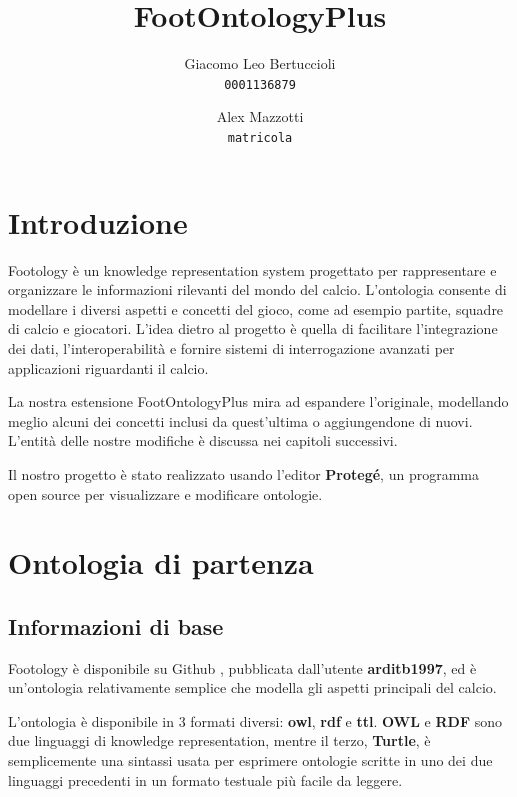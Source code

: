 \documentclass[11pt]{report} %
\title{FootOntologyPlus}
\author{
  Giacomo Leo Bertuccioli\\
  \texttt{0001136879}
  \and
  Alex Mazzotti\\
  \texttt{matricola}
}
\date{} %
\begin{document}
\maketitle

\newpage

\renewcommand*\contentsname{Indice}

\tableofcontents
\newpage

\chapter{Introduzione}

Footology \cite{foot} è un knowledge representation system progettato per rappresentare e organizzare le informazioni rilevanti del mondo del calcio.
L'ontologia consente di modellare i diversi aspetti e concetti del gioco, come ad esempio partite, squadre di calcio e giocatori.
L'idea dietro al progetto è quella di facilitare l'integrazione dei dati, l'interoperabilità e fornire sistemi di interrogazione avanzati per applicazioni riguardanti il calcio.

\hfill

La nostra estensione FootOntologyPlus mira ad espandere l'originale, modellando meglio alcuni dei concetti inclusi da quest'ultima o aggiungendone di nuovi.
L'entità delle nostre modifiche è discussa nei capitoli successivi.

\hfill

Il nostro progetto è stato realizzato usando l'editor \textbf{Protegé}, un programma open source per visualizzare e modificare ontologie.

\chapter{Ontologia di partenza}

\section{Informazioni di base}

Footology è disponibile su Github \cite{foot}, pubblicata dall'utente \textbf{arditb1997}, ed è un'ontologia relativamente semplice che modella gli aspetti principali del calcio.

\hfill

L'ontologia è disponibile in 3 formati diversi: \textbf{owl}, \textbf{rdf} e \textbf{ttl}.
\textbf{OWL} e \textbf{RDF} sono due linguaggi di knowledge representation, mentre il terzo, \textbf{Turtle}, è semplicemente una sintassi usata per esprimere ontologie scritte in uno dei due linguaggi precedenti in un formato testuale più facile da leggere. 
\end{document}
